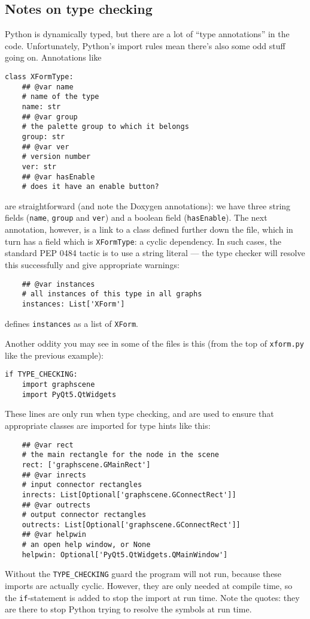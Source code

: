 \subsection{Notes on type checking}
Python is dynamically typed, but there are a lot of ``type annotations''
in the code. Unfortunately, Python's import rules mean there's also some
odd stuff going on. Annotations like
\begin{lstlisting}
class XFormType:
    ## @var name
    # name of the type
    name: str
    ## @var group
    # the palette group to which it belongs
    group: str
    ## @var ver
    # version number
    ver: str
    ## @var hasEnable
    # does it have an enable button?
\end{lstlisting}
are straightforward (and note the Doxygen annotations): we have three
string fields (\texttt{name}, \texttt{group} and \texttt{ver}) and
a boolean field (\texttt{hasEnable}). The next annotation, however,
is a link to a class defined further down the file, which in turn has
a field which is \texttt{XFormType}: a cyclic dependency. In such cases,
the standard PEP 0484 tactic is to use a string literal --- the type
checker will resolve this successfully and give appropriate warnings:
\begin{lstlisting}
    ## @var instances
    # all instances of this type in all graphs
    instances: List['XForm']
\end{lstlisting}
defines \texttt{instances} as a list of \texttt{XForm}.

Another oddity you may see in some of the files is this (from the top
of \texttt{xform.py} like the previous example):
\begin{lstlisting}
if TYPE_CHECKING:
    import graphscene
    import PyQt5.QtWidgets
\end{lstlisting}
These lines are only run when type checking, and are used to ensure
that appropriate classes are imported for type hints like this:
\begin{lstlisting}
    ## @var rect
    # the main rectangle for the node in the scene
    rect: ['graphscene.GMainRect']
    ## @var inrects
    # input connector rectangles
    inrects: List[Optional['graphscene.GConnectRect']]
    ## @var outrects
    # output connector rectangles
    outrects: List[Optional['graphscene.GConnectRect']]
    ## @var helpwin
    # an open help window, or None
    helpwin: Optional['PyQt5.QtWidgets.QMainWindow']
\end{lstlisting}
Without the \texttt{TYPE\_CHECKING} guard the program will not run, because
these imports are actually cyclic. However, they are only needed at 
compile time, so the \texttt{if}-statement is added to stop the import
at run time. Note the quotes: they are there to stop Python trying to
resolve the symbols at run time.

